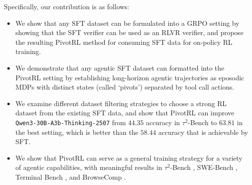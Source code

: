 Specifically, our contribution is as follows:
\begin{itemize}
    \item We show that any SFT dataset can be formulated into a GRPO setting by showing that the SFT verifier can be used as an RLVR verifier, and propose the resulting PivotRL method for consuming SFT data for on-policy RL training.
    \item We demonstrate that any agentic SFT dataset can formatted into the PivotRL setting by establishing long-horizon agentic trajectories as eposodic MDPs with distinct states (called `pivots') separated by tool call actions.
    \item We examine different dataset filtering strategies to choose a strong RL dataset from the existing SFT data, and show that PivotRL can improve \texttt{Qwen3-30B-A3b-Thinking-2507} from $44.35$ accuracy in $\tau^2$-Bench to $63.81$ in the best setting, which is better than the $58.44$ accuracy that is achievable by SFT.
    \item We show that PivotRL can serve as a general training strategy for a variety of agentic capabilities, with meaningful results in $\tau^2$-Bench \citep{barres2025tau2bench}, SWE-Bench \cite{jimenez2024swebench}, Terminal Bench \citep{tbench_2025}, and BrowseComp \citep{wei2025browsecompsimplechallengingbenchmark}.
\end{itemize}



